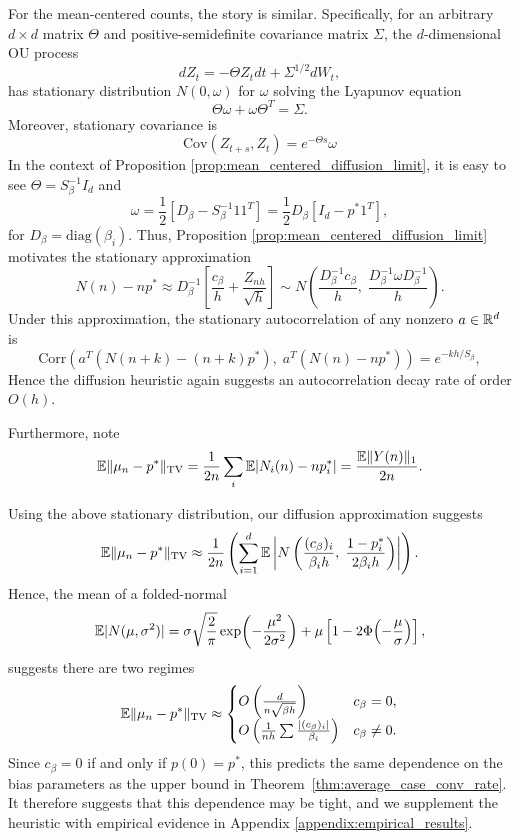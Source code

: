 For the mean-centered counts, the story is similar. Specifically, for an arbitrary $d\times d$ matrix $\Theta$ and positive-semidefinite covariance matrix $\Sigma$, the $d$-dimensional OU process
%
\[dZ_t = -\Theta Z_t dt + \Sigma^{1/2} dW_t,\]
%
\noindent has stationary distribution $N(0, \omega)$ for $\omega$ solving the Lyapunov equation
%
\[\Theta \omega + \omega \Theta^T = \Sigma.\]
%
\noindent Moreover, stationary covariance is
%
\[\mathrm{Cov}(Z_{t+s}, Z_t) = e^{-\Theta s} \omega\]
%
\noindent In the context of Proposition \ref{prop:mean_centered_diffusion_limit}, it is easy to see $\Theta = S_\beta^{-1} I_d$ and
%
\[\omega = \frac{1}{2} [D_\beta - S_\beta^{-1} 11^T] = \frac{1}{2}D_\beta [I_d - p^*1^T],\]
%
\noindent for $D_\beta = \mathrm{diag}(\beta_i)$. Thus, Proposition \ref{prop:mean_centered_diffusion_limit} motivates the stationary approximation
%
\[N(n) - np^* \approx D_\beta^{-1} \left[\frac{c_\beta}{h} + \frac{Z_{nh}}{\sqrt{h}} \right] \sim N\left( \frac{D_\beta^{-1}c_\beta}{h},\;  \frac{D_\beta^{-1}\omega D_\beta^{-1}}{h}\right).\]
%
\noindent Under this approximation, the stationary autocorrelation of any nonzero $a \in \mathbb{R}^d$ is
%
\[\mathrm{Corr}(a^T(N(n+k) - (n+k)p^*), \; a^T(N(n) - np^*)) = e^{-k h / S_\beta},\]
%
Hence the diffusion heuristic again suggests an autocorrelation decay rate of 
order $O(h)$.

Furthermore, note
%
\[\mathbb{E} \|\mu_n - p^*\|_{\operatorname{TV}} = \frac{1}{2n} \sum_i \mathbb{E}|N_i(n) - np_i^*| = \frac{\mathbb{E} \|Y(n)\|_1}{2n}.\]
%

\noindent Using the above stationary distribution, our diffusion approximation suggests
%
\[\mathbb{E} \|\mu_n - p^*\|_{\operatorname{TV}} \approx \frac{1}{2n}\left(\sum_{i=1}^d \mathbb{E} \left|N\left(\frac{(c_\beta)_i}{\beta_i h}, \;  \frac{1-p_i^*}{2\beta_ih}\right)\right| \right).\]
%
\noindent Hence, the mean of a folded-normal
%
\[\mathbb{E} |N(\mu, \sigma^2)| =
\sigma \sqrt{\frac{2}{\pi}}
\exp\!\left(-\frac{\mu^2}{2\sigma^2}\right)
+
\mu\left[1-
2\Phi\!\left(-\frac{\mu}{\sigma}\right)
\right],
\]
\noindent suggests there are two regimes
%
\[\mathbb{E} \|\mu_n - p^*\|_{\operatorname{TV}} \approx \begin{cases}
    O\left(\frac{d}{n\sqrt{\beta h}}\right) & c_\beta = 0,\\[5pt]
    O\left(\frac{1}{nh} \sum \frac{|(c_\beta)_i|}{\beta_i}\right)& c_\beta \neq 0.\\
\end{cases}\]
%
\noindent Since $c_\beta = 0$ if and only if $p(0) = p^*$, this predicts the same dependence on the bias parameters as the upper bound in Theorem~\ref{thm:average_case_conv_rate}. It therefore suggests that this dependence may be tight, and we supplement the heuristic with empirical evidence in Appendix \ref{appendix:empirical_results}.

